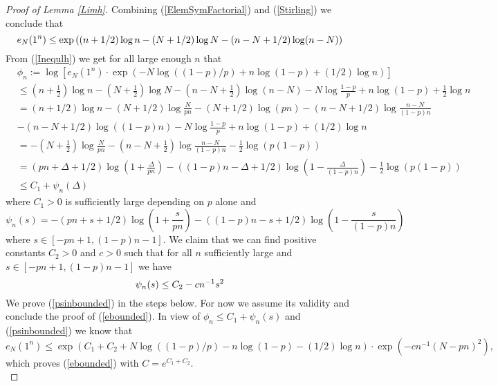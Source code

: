 \begin{proof}[Proof of Lemma \ref{Limh}]
Combining (\ref{ElemSymFactorial}) and (\ref{Stirling}) we conclude that 
\begin{equation}{\label{Inequlh}}
	e_{N}(1^n)\leq \exp\left((n+1/2)\log n-(N+1/2)\log N-(n-N+1/2)\log (n-N)\right)
\end{equation}
From (\ref{Inequlh}) we get for all large enough $n$ that
\begin{equation*}
\begin{split}
	&\phi_{n}:=\log\left[e_{N}(1^n)\cdot\exp\left(-N\log((1-p)/p)+n\log(1-p)+(1/2)\log n\right)\right]\\
	&\leq (n+\frac{1}{2})\log n-(N+\frac{1}{2})\log N-(n-N+\frac{1}{2})\log (n-N)-N\log\frac{1-p}{p}+n\log(1-p)+\frac{1}{2}\log n\\
	& =(n+1/2)\log n-(N+1/2)\log \frac{N}{pn}-(N+1/2)\log (pn)-(n-N+1/2)\log\frac{n-N}{(1-p)n}\\
	& -(n-N+1/2)\log((1-p)n)-N\log\frac{1-p}{p}+n\log(1-p)+(1/2)\log n\\
	&=-(N+\frac{1}{2})\log\frac{N}{pn}-(n-N+\frac{1}{2})\log\frac{n-N}{(1-p)n}-\frac{1}{2}\log \left(p(1-p)\right)\\
	& =(pn+\Delta+1/2)\log \left(1+\frac{\Delta}{pn}\right)-((1-p)n-\Delta+1/2)\log\left(1-\frac{\Delta}{(1-p)n}\right)-\frac{1}{2}\log \left(p(1-p)\right)\\
	&\leq C_{1}+\psi_{n}(\Delta)
\end{split}
\end{equation*}
where $C_{1}>0$ is sufficiently large depending on $p$ alone and
\begin{equation}
	\psi_{n}(s)=-(pn+s+1/2)\log\left(1+\frac{s}{pn}\right)-((1-p)n-s+1/2)\log\left(1-\frac{s}{(1-p)n}\right)
\end{equation}
where $s\in [-pn+1,(1-p)n-1]$. We claim that we can find positive constants $C_2>0$ and $c>0$ such that for all $n$ sufficiently large and $s\in[-pn+1,(1-p)n-1]$ we have
\begin{equation}{\label{psinbounded}}
	\psi_{n}(s)\leq C_2-cn^{-1}s^{2}
\end{equation}
We prove (\ref{psinbounded}) in the steps below. For now we assume its validity and conclude the proof of (\ref{ebounded}).
In view of $\phi_{n}\leq C_1+\psi_{n}(s)$ and (\ref{psinbounded}) we know that
\begin{equation*}
	e_{N}(1^n)\leq \exp\left(C_1+C_2+N\log((1-p)/p)-n\log(1-p)-(1/2)\log n\right)\cdot\exp(-cn^{-1}(N-pn)^2),
\end{equation*}
which proves (\ref{ebounded}) with $C=e^{C_1+C_2}$.\\

\end{proof}
